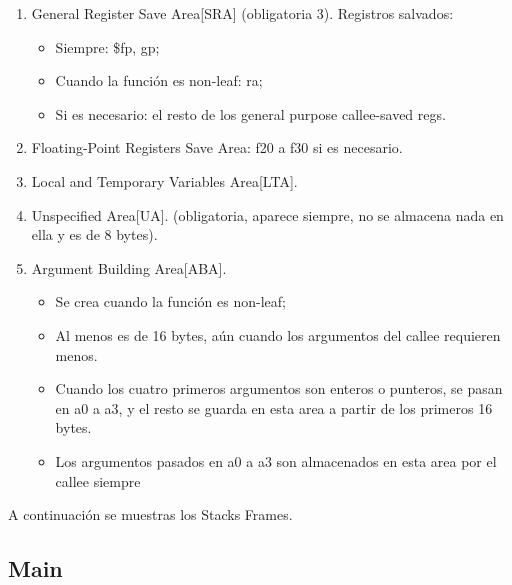 \documentclass[a4paper,10pt]{article}
\begin{document}
  \begin{enumerate}[$\star$]
    \item General Register Save Area[SRA] (obligatoria 3). Registros salvados:
      \begin{itemize}
	\item Siempre: \$fp, gp;
	\item Cuando la funci\'on es non-leaf: ra;
	\item Si es necesario: el resto de los general purpose callee-saved regs.
      \end{itemize}
    \item Floating-Point Registers Save Area: f20 a f30 si es necesario.
    \item Local and Temporary Variables Area[LTA].
    \item Unspecified Area[UA]. (obligatoria, aparece siempre, no se almacena nada en ella y es de 8 bytes).
    \item Argument Building Area[ABA].
      \begin{itemize}
	\item Se crea cuando la funci\'on es non-leaf;
	\item Al menos es de 16 bytes, a\'un cuando los argumentos del callee requieren menos.
	\item Cuando los cuatro primeros argumentos son enteros o punteros, se pasan en a0 a a3, y el resto se guarda en esta area a partir de los primeros 16 bytes.
	\item Los argumentos pasados en a0 a a3 son almacenados en esta area por el callee siempre
      \end{itemize}
  \end{enumerate}

  A continuaci\'on se muestras los Stacks Frames.

  \subsection{Main}
\end{document}
